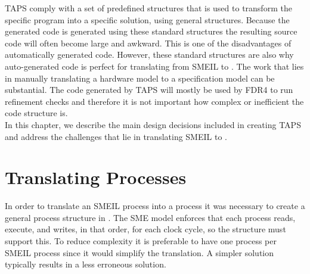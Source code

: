 TAPS comply with a set of predefined structures that is used to transform the specific program into a specific solution, using general structures. Because the generated code is generated using these standard structures the resulting source code will often become large and awkward. This is one of the disadvantages of automatically generated code. However, these standard structures are also why auto-generated code is perfect for translating from SMEIL to \cspm{}. The work that lies in manually translating a hardware model to a specification model can be substantial. The code generated by TAPS will mostly be used by FDR4 to run refinement checks and therefore it is not important how complex or inefficient the code structure is. \\

In this chapter, we describe the main design decisions included in creating TAPS and address the challenges that lie in translating SMEIL to \cspm{}.
\section{Translating Processes}
In order to translate an SMEIL process into a \cspm{} process it was necessary to create a general process structure in \cspm{}. The SME model enforces that each process reads, execute, and writes, in that order, for each clock cycle, so the \cspm{} structure must support this. To reduce complexity it is preferable to have one \cspm{} process per SMEIL process since it would simplify the translation. A simpler solution typically results in a less erroneous solution.\\

